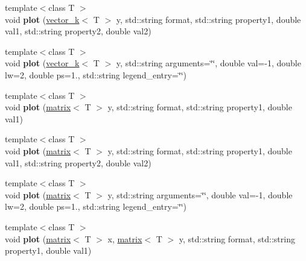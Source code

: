 \begin{DoxyCompactItemize}
\item 
\hypertarget{classkeycpp_1_1_figure_ae78a7ea84ec3acbe86ecbb962cc23207}{{\footnotesize template$<$class T $>$ }\\void {\bfseries plot} (\hyperlink{classkeycpp_1_1vector__k}{vector\-\_\-k}$<$ T $>$ y, std\-::string format, std\-::string property1, double val1, std\-::string property2, double val2)}\label{classkeycpp_1_1_figure_ae78a7ea84ec3acbe86ecbb962cc23207}

\item 
\hypertarget{classkeycpp_1_1_figure_ac5ab6d77e2ddca6eca08bcf9d60035b5}{{\footnotesize template$<$class T $>$ }\\void {\bfseries plot} (\hyperlink{classkeycpp_1_1vector__k}{vector\-\_\-k}$<$ T $>$ y, std\-::string arguments=\char`\"{}\char`\"{}, double val=-\/1, double lw=2, double ps=1., std\-::string legend\-\_\-entry=\char`\"{}\char`\"{})}\label{classkeycpp_1_1_figure_ac5ab6d77e2ddca6eca08bcf9d60035b5}

\item 
\hypertarget{classkeycpp_1_1_figure_a88e55b3a2c1b05c7c7fe2e6785e11f58}{{\footnotesize template$<$class T $>$ }\\void {\bfseries plot} (\hyperlink{classkeycpp_1_1matrix}{matrix}$<$ T $>$ y, std\-::string format, std\-::string property1, double val1)}\label{classkeycpp_1_1_figure_a88e55b3a2c1b05c7c7fe2e6785e11f58}

\item 
\hypertarget{classkeycpp_1_1_figure_a2e6daf7811c3d34fabb83bc8368e1e7c}{{\footnotesize template$<$class T $>$ }\\void {\bfseries plot} (\hyperlink{classkeycpp_1_1matrix}{matrix}$<$ T $>$ y, std\-::string format, std\-::string property1, double val1, std\-::string property2, double val2)}\label{classkeycpp_1_1_figure_a2e6daf7811c3d34fabb83bc8368e1e7c}

\item 
\hypertarget{classkeycpp_1_1_figure_a39dd5e2d5e6acb6db99ac75476ea777a}{{\footnotesize template$<$class T $>$ }\\void {\bfseries plot} (\hyperlink{classkeycpp_1_1matrix}{matrix}$<$ T $>$ y, std\-::string arguments=\char`\"{}\char`\"{}, double val=-\/1, double lw=2, double ps=1., std\-::string legend\-\_\-entry=\char`\"{}\char`\"{})}\label{classkeycpp_1_1_figure_a39dd5e2d5e6acb6db99ac75476ea777a}

\item 
\hypertarget{classkeycpp_1_1_figure_a35987b305f55c3b8c612fbaec2223060}{{\footnotesize template$<$class T $>$ }\\void {\bfseries plot} (\hyperlink{classkeycpp_1_1matrix}{matrix}$<$ T $>$ x, \hyperlink{classkeycpp_1_1matrix}{matrix}$<$ T $>$ y, std\-::string format, std\-::string property1, double val1)}\label{classkeycpp_1_1_figure_a35987b305f55c3b8c612fbaec2223060}


\end{DoxyCompactItemize}

